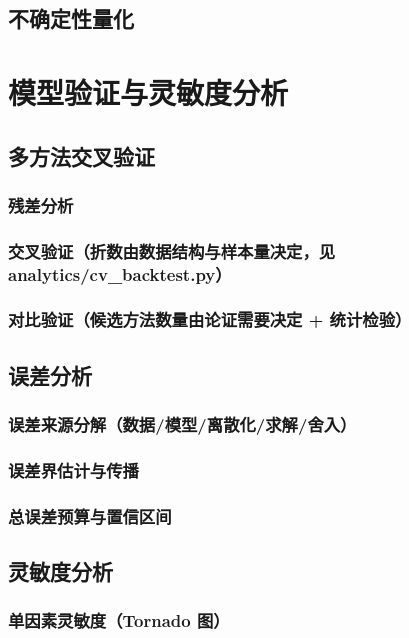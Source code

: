 \documentclass[12pt,a4paper]{ctexart}
\begin{document}
\subsection{不确定性量化}  %


\section{模型验证与灵敏度分析}
\subsection{多方法交叉验证}
\subsubsection{残差分析}
\subsubsection{交叉验证（折数由数据结构与样本量决定，见 analytics/cv\_backtest.py）}
\subsubsection{对比验证（候选方法数量由论证需要决定 + 统计检验）}
\subsection{误差分析}  %
\subsubsection{误差来源分解（数据/模型/离散化/求解/舍入）}
\subsubsection{误差界估计与传播}
\subsubsection{总误差预算与置信区间}
\subsection{灵敏度分析}
\subsubsection{单因素灵敏度（Tornado 图）}
\end{document}
